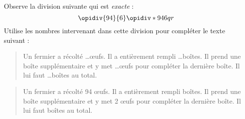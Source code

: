 \par Observe la division suivante qui est {\em exacte} :
\[\opidiv{94}{6}\opidiv*{94}{6}{q}{r}\]
Utilise les nombres intervenant dans cette division pour compléter le texte suivant :
\begin{quote}
  Un fermier a récolté \ldots \oe ufs. Il a entièrement rempli \ldots boîtes. Il prend une boîte supplémentaire et y met \ldots \oe ufs pour compléter la dernière boîte. Il lui faut \ldots boîtes au total.
\end{quote}
\begin{quote}
  Un fermier a récolté 94 \oe ufs. Il a entièrement rempli  boîtes. Il prend une boîte supplémentaire et y met 2 \oe ufs pour compléter la dernière boîte. Il lui faut  boîtes au total.
\end{quote}
